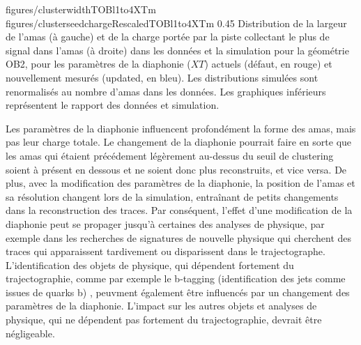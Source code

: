                  {figures/clusterwidthTOBl1to4XTm}
                 {figures/clusterseedchargeRescaledTOBl1to4XTm} %
                 {0.45}       %
                 {Distribution de la largeur de l'amas (à gauche) et de la charge portée par la piste collectant le plus de signal dans l'amas (à droite) dans les données et la simulation pour la géométrie OB2, pour les paramètres de la diaphonie ($XT$) actuels (défaut, en rouge) et nouvellement mesurés (updated, en bleu). Les distributions simulées sont renormalisés au nombre d'amas dans les données. Les graphiques inférieurs représentent le rapport des données et simulation. }



Les paramètres de la diaphonie influencent profondément la forme des amas, mais pas leur charge totale. Le changement de la diaphonie pourrait faire en sorte que les amas qui étaient précédement légèrement au-dessus du seuil de clustering soient à présent en dessous et ne soient donc plus reconstruits, et vice versa. De plus, avec la modification des paramètres de la diaphonie, la position de l'amas et sa résolution changent lors de la simulation, entraînant de petits changements dans la reconstruction des traces. Par conséquent, l'effet d'une modification de la diaphonie peut se propager jusqu'à certaines des analyses de physique, par exemple dans les recherches de signatures de nouvelle physique qui cherchent des traces qui apparaissent tardivement ou disparissent dans le trajectographe. L'identification des objets de physique, qui dépendent fortement du trajectographie, comme par exemple le b-tagging (identification des jets comme issues de quarks b) , peuvment également être influencés par un changement des paramètres de la diaphonie. L'impact sur les autres objets et analyses de physique, qui ne dépendent pas fortement du trajectographie, devrait être négligeable.

